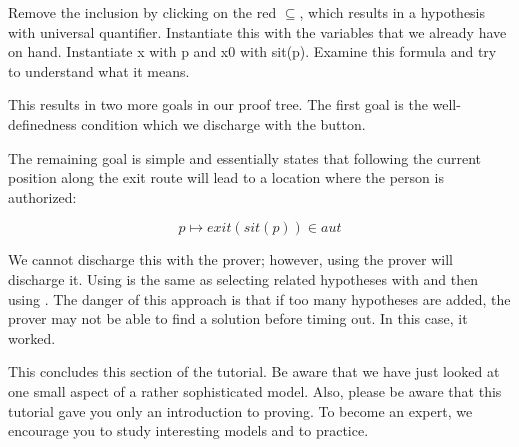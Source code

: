 
Remove the inclusion by clicking on the red $\subseteq$, which results in a hypothesis with universal quantifier. Instantiate this with the variables that we already have on hand.  Instantiate x with p and x0 with sit(p).  Examine this formula and try to understand what it means.

This results in two more goals in our proof tree. The first goal is the well-definedness condition which we discharge with the  button.

The remaining goal is simple and essentially states that following the current position along the exit route will lead to a location where the person is authorized:

$$ p \mapsto exit(sit(p)) \in aut $$

We cannot discharge this with the  prover; however, using the  prover will discharge it.  Using  is the same as selecting related hypotheses with  and then using .  The danger of this approach is that if too many hypotheses are added, the prover may not be able to find a solution before timing out.  In this case, it worked.



This concludes this section of the tutorial. Be aware that we have just looked at one small aspect of a rather sophisticated model.  Also, please be aware that this tutorial gave you only an introduction to proving.  To become an expert, we encourage you to study interesting models and to practice.

